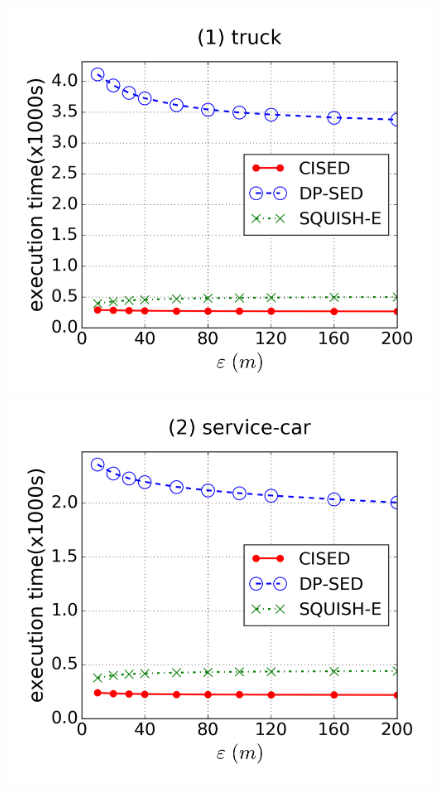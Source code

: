 \begin{figure}[tb!]
\centering
\includegraphics[scale = 0.25]{figures/Exp-time-epsilon-truck.png}
\includegraphics[scale = 0.25]{figures/Exp-time-epsilon-service.png}

\end{figure}
